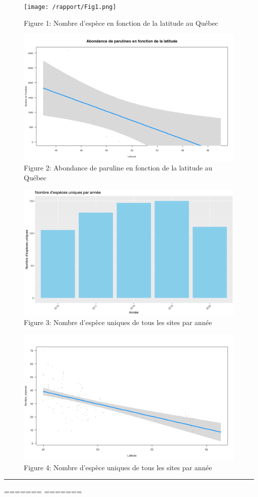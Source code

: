 \documentclass[
]{article}
\begin{document}
\begin{figure}
\centering
\texttt{[image: /rapport/Fig1.png]}
\caption{Figure 1: Nombre d'espèce en fonction de la latitude au Québec}
\end{figure}

\begin{figure}
\centering
\includegraphics{./rapport/Figure2.png}
\caption{Figure 2: Abondance de paruline en fonction de la latitude au
Québec}
\end{figure}

\begin{figure}
\centering
\includegraphics{./rapport/Fig3.png}
\caption{Figure 3: Nombre d'espèce uniques de tous les sites par année}
\end{figure}

\begin{figure}
\centering
\includegraphics{./rapport/Figure4.png}
\caption{Figure 4: Nombre d'espèce uniques de tous les sites par année}
\end{figure}

\begin{center}\rule{0.5\linewidth}{0.5pt}\end{center}

======= \showmatmethods \showacknow \pnasbreak =======
\end{document}
